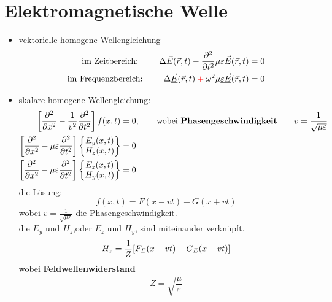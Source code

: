 \documentclass[nochapterpage,bigchapter,linedtoc,longdoc,colorback,accentcolor=tud2c]{tudreport}
\newcommand*{\mathcolor}{}
\def\mathcolor#1#{\mathcoloraux{#1}}
\newcommand*{\mathcoloraux}[3]{%
  \protect\leavevmode
  \begingroup
    \color#1{#2}#3%
  \endgroup
}
\begin{document}
\section{Elektromagnetische Welle}
\begin{itemize} 
	\item vektorielle homogene Wellengleichung
	\begin{equation*}
		\begin{aligned}
			\text{im Zeitbereich: }\qquad \Delta \vec{E}(\vec{r},t) - \frac{\partial^2}{\partial t^2} \mu \varepsilon \vec{E}(\vec{r},t) &=0\\
			\text{im Frequenzbereich: } \qquad \Delta \underline{\vec{E}}(\vec{r},t) \mathcolor{red}{+} \omega^2\mu \underline{\varepsilon \vec{E}}(\vec{r},t) &=0\\
		\end{aligned}
	\end{equation*}
	\item skalare homogene Wellengleichung:
	\begin{equation*}
		\begin{aligned}
			\left[ \frac{\partial^2}{\partial x^2} - \frac{1}{v^2}\frac{\partial^2}{\partial t^2} \right] f(x,t) &=0 , \qquad \text{wobei \textbf{Phasengeschwindigkeit}} \qquad v=\frac{1}{\sqrt{\mu \varepsilon}} \\
			\left[ \frac{\partial^2}{\partial x^2} - \mu \varepsilon \frac{\partial^2}{\partial t^2} \right] \begin{Bmatrix}
				E_y(x,t)\\ H_z(x,t)\\
			\end{Bmatrix} &= 0\\
			\left[ \frac{\partial^2}{\partial x^2} - \mu \varepsilon \frac{\partial^2}{\partial t^2} \right] \begin{Bmatrix}
				E_z(x,t)\\ H_y(x,t)\\
			\end{Bmatrix} &= 0\\
		\end{aligned}
	\end{equation*}
	die Lösung: \begin{equation*}
		f(x,t) = F(x-vt) + G(x+vt)
	\end{equation*}
	wobei $v = \frac{1}{\sqrt{\mu \varepsilon}}$ die Phasengeschwindigkeit.\\
	die $E_y$ und $H_z$,oder $E_z$ und $H_y$, sind miteinander verknüpft.
	\begin{equation*}
		\begin{aligned}
			H_z &= \frac{1}{Z}[F_E(x-vt) \mathcolor{red}{-} G_E(x+ vt)] \\
		\end{aligned}
	\end{equation*}
	wobei \textbf{Feldwellenwiderstand} $$Z=\sqrt{\frac{\mu}{\varepsilon}}$$
\end{itemize}
\end{document}
